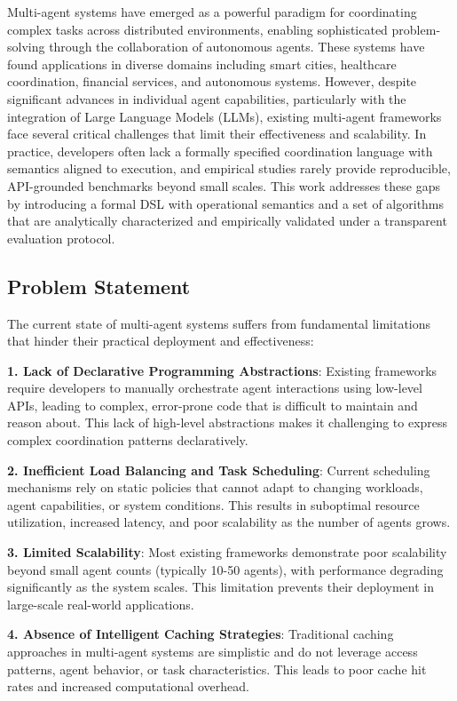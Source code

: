 \documentclass[conference]{IEEEtran}
\begin{document}
Multi-agent systems have emerged as a powerful paradigm for coordinating complex tasks across distributed environments, enabling sophisticated problem-solving through the collaboration of autonomous agents. These systems have found applications in diverse domains including smart cities, healthcare coordination, financial services, and autonomous systems. However, despite significant advances in individual agent capabilities, particularly with the integration of Large Language Models (LLMs), existing multi-agent frameworks face several critical challenges that limit their effectiveness and scalability. In practice, developers often lack a formally specified coordination language with semantics aligned to execution, and empirical studies rarely provide reproducible, API-grounded benchmarks beyond small scales. This work addresses these gaps by introducing a formal DSL with operational semantics and a set of algorithms that are analytically characterized and empirically validated under a transparent evaluation protocol.

\subsection{Problem Statement}

The current state of multi-agent systems suffers from fundamental limitations that hinder their practical deployment and effectiveness:

\textbf{1. Lack of Declarative Programming Abstractions}: Existing frameworks require developers to manually orchestrate agent interactions using low-level APIs, leading to complex, error-prone code that is difficult to maintain and reason about. This lack of high-level abstractions makes it challenging to express complex coordination patterns declaratively.

\textbf{2. Inefficient Load Balancing and Task Scheduling}: Current scheduling mechanisms rely on static policies that cannot adapt to changing workloads, agent capabilities, or system conditions. This results in suboptimal resource utilization, increased latency, and poor scalability as the number of agents grows.

\textbf{3. Limited Scalability}: Most existing frameworks demonstrate poor scalability beyond small agent counts (typically 10-50 agents), with performance degrading significantly as the system scales. This limitation prevents their deployment in large-scale real-world applications.

\textbf{4. Absence of Intelligent Caching Strategies}: Traditional caching approaches in multi-agent systems are simplistic and do not leverage access patterns, agent behavior, or task characteristics. This leads to poor cache hit rates and increased computational overhead.
\end{document}
